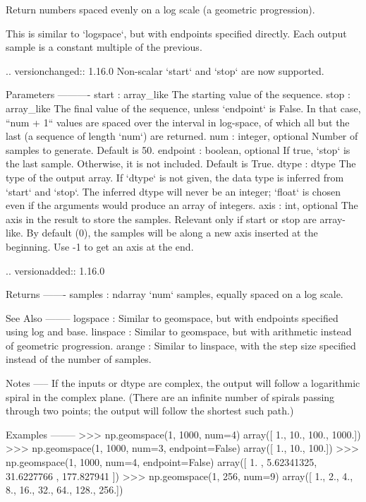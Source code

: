 \begin{DoxyVerb}Return numbers spaced evenly on a log scale (a geometric progression).

This is similar to `logspace`, but with endpoints specified directly.
Each output sample is a constant multiple of the previous.

.. versionchanged:: 1.16.0
    Non-scalar `start` and `stop` are now supported.

Parameters
----------
start : array_like
    The starting value of the sequence.
stop : array_like
    The final value of the sequence, unless `endpoint` is False.
    In that case, ``num + 1`` values are spaced over the
    interval in log-space, of which all but the last (a sequence of
    length `num`) are returned.
num : integer, optional
    Number of samples to generate.  Default is 50.
endpoint : boolean, optional
    If true, `stop` is the last sample. Otherwise, it is not included.
    Default is True.
dtype : dtype
    The type of the output array.  If `dtype` is not given, the data type
    is inferred from `start` and `stop`. The inferred dtype will never be
    an integer; `float` is chosen even if the arguments would produce an
    array of integers.
axis : int, optional
    The axis in the result to store the samples.  Relevant only if start
    or stop are array-like.  By default (0), the samples will be along a
    new axis inserted at the beginning. Use -1 to get an axis at the end.

    .. versionadded:: 1.16.0

Returns
-------
samples : ndarray
    `num` samples, equally spaced on a log scale.

See Also
--------
logspace : Similar to geomspace, but with endpoints specified using log
           and base.
linspace : Similar to geomspace, but with arithmetic instead of geometric
           progression.
arange : Similar to linspace, with the step size specified instead of the
         number of samples.

Notes
-----
If the inputs or dtype are complex, the output will follow a logarithmic
spiral in the complex plane.  (There are an infinite number of spirals
passing through two points; the output will follow the shortest such path.)

Examples
--------
>>> np.geomspace(1, 1000, num=4)
array([    1.,    10.,   100.,  1000.])
>>> np.geomspace(1, 1000, num=3, endpoint=False)
array([   1.,   10.,  100.])
>>> np.geomspace(1, 1000, num=4, endpoint=False)
array([   1.        ,    5.62341325,   31.6227766 ,  177.827941  ])
>>> np.geomspace(1, 256, num=9)
array([   1.,    2.,    4.,    8.,   16.,   32.,   64.,  128.,  256.])


\end{DoxyVerb}
